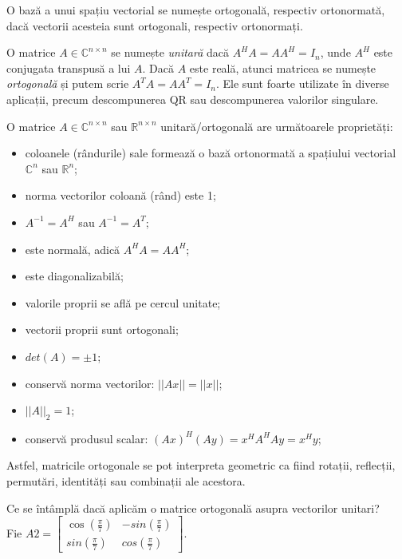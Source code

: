 \documentclass{exam}
\begin{document}
\par O bază a unui spațiu vectorial se numește ortogonală, respectiv ortonormată,
dacă vectorii acesteia sunt ortogonali, respectiv ortonormați.

\par O matrice $A \in \mathbb{C}^{n \times n}$ se numește \textit{unitară} dacă
$A^HA = AA^H = I_n$, unde $A^H$ este conjugata transpusă a lui $A$. Dacă $A$
este reală, atunci matricea se numește \textit{ortogonală} și putem scrie
$A^TA = AA^T = I_n$. Ele sunt foarte utilizate în diverse aplicații, precum
descompunerea QR sau descompunerea valorilor singulare.

\par O matrice $A \in \mathbb{C}^{n \times n}$ sau $\mathbb{R}^{n \times n}$
unitară/ortogonală are următoarele proprietăți:

\begin{itemize}
	\item coloanele (rândurile) sale formează o bază ortonormată a spațiului
	      vectorial $\mathbb{C}^n$ sau $\mathbb{R}^n$;
	\item norma vectorilor coloană (rând) este 1;
	\item $A^{-1} = A^H$ sau $A^{-1} = A^T$;
	\item este normală, adică $A^HA = AA^H$;
	\item este diagonalizabilă;
	\item valorile proprii se află pe cercul unitate;
	\item vectorii proprii sunt ortogonali;
	\item $det(A) = \pm 1$;
	\item conservă norma vectorilor: $||Ax|| = ||x||$;
	\item $||A||_2 = 1$;
	\item conservă produsul scalar: $(Ax)^H(Ay) = x^HA^HAy = x^Hy$;
\end{itemize}

\par Astfel, matricile ortogonale se pot interpreta geometric ca fiind rotații,
reflecții, permutări, identități sau combinații ale acestora.

\par Ce se întâmplă dacă aplicăm o matrice ortogonală asupra vectorilor unitari? \\
Fie $A2 = \begin{bmatrix} \cos(\frac{\pi}{7}) & -sin(\frac{\pi}{7}) \\ sin(\frac{\pi}{7}) & cos(\frac{\pi}{7}) \end{bmatrix}$.
\end{document}
